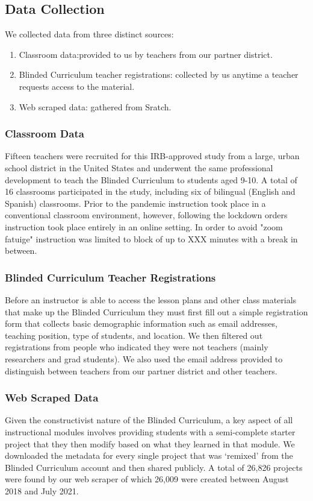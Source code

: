 \documentclass[sigconf,manuscript,review,anonymous]{acmart} %
\newcommand{\Scratchencore}[0]{Blinded Curriculum}
\begin{document}
\subsection{Data Collection}
We collected data from three distinct sources:
\begin{enumerate}
    \item Classroom data:provided to us by teachers from our partner district.
    \item \Scratchencore{} teacher registrations: collected by us anytime a teacher requests access to the material.
    \item Web scraped data: gathered from Sratch.
\end{enumerate}
\subsubsection{Classroom Data}
Fifteen teachers were recruited for this IRB-approved study from a large, urban school district in the United States and underwent the same professional development to teach the \Scratchencore{} to students aged 9-10. A total of 16 classrooms participated in the study, including six of bilingual (English and Spanish) classrooms. Prior to the pandemic instruction took place in a conventional classroom environment, however, following the lockdown orders instruction took place entirely in an online setting. In order to avoid "zoom fatuige" instruction was limited to block of up to XXX minutes with a break in between.
\subsubsection{\Scratchencore{} Teacher Registrations}
Before an instructor is able to access the lesson plans and other class materials that make
up the \Scratchencore{} they must first fill out a simple registration form that collects basic demographic information such as email addresses, teaching position, type of students, and location. We then filtered out registrations from people who indicated they were not teachers (mainly researchers and grad students). We also used the email address provided to distinguish between teachers from our partner district and other teachers.
\subsubsection{Web Scraped Data}
Given the constructivist nature of the \Scratchencore{}, a key aspect of all instructional modules involves providing students with a semi-complete starter project that they then modify based on what they learned in that module. We downloaded the metadata for every single project that was `remixed' from the \Scratchencore{} account and then shared publicly. A total of 26,826 projects were found by our web scraper of which 26,009 were created between August 2018 and July 2021.
\end{document}

